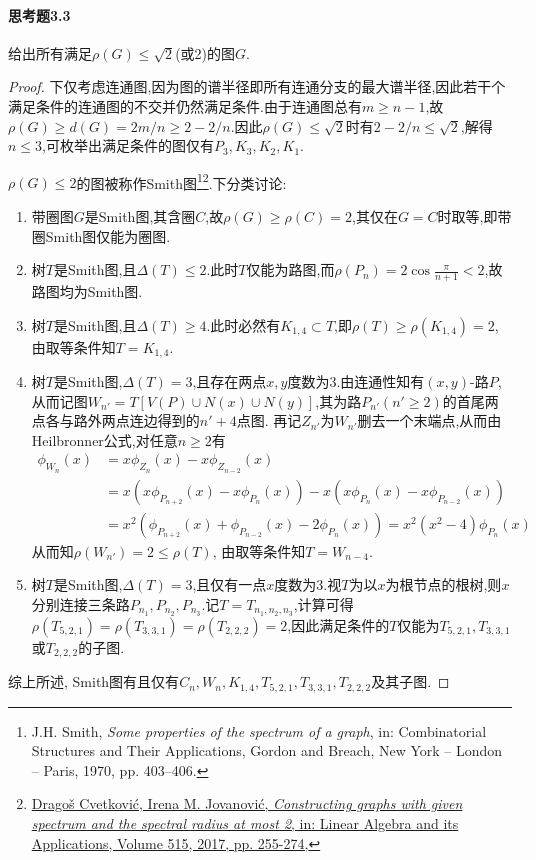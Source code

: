 \documentclass[11pt]{article}
\begin{document}
\paragraph{思考题3.3}给出所有满足$\rho(G)\leq \sqrt{2}$(或2)的图$G$.
\begin{proof}
    下仅考虑连通图,因为图的谱半径即所有连通分支的最大谱半径,因此若干个满足条件的连通图的不交并仍然满足条件.由于连通图总有$m\geq n-1$,故$\rho(G)\geq d(G)=2m/n\geq 2-2/n$.因此$\rho(G)\leq \sqrt{2}$时有$2-2/n\leq \sqrt{2}$,解得$n\leq 3$,可枚举出满足条件的图仅有$P_3,K_3,K_2,K_1$.

    $\rho(G)\leq 2$的图被称作Smith图\footnote{J.H. Smith, \textit{Some properties of the spectrum of a graph}, in: Combinatorial Structures and Their Applications, Gordon and Breach, New York -- London -- Paris, 1970, pp. 403--406.}\footnote{\href{https://doi.org/10.1016/j.laa.2016.11.020}{Dragoš Cvetković, Irena M. Jovanović, \textit{Constructing graphs with given spectrum and the spectral radius at most 2}, in: Linear Algebra and its Applications, Volume 515, 2017, pp. 255-274,}}.下分类讨论:
    \begin{enumerate}
        \item 带圈图$G$是Smith图,其含圈$C$,故$\rho(G)\geq\rho(C)=2$,其仅在$G=C$时取等,即带圈Smith图仅能为圈图.
        \item 树$T$是Smith图,且$\Delta(T)\leq 2$.此时$T$仅能为路图,而$\rho(P_n)=2\cos\frac{\pi}{n+1}<2$,故路图均为Smith图.
        \item 树$T$是Smith图,且$\Delta(T)\geq 4$.此时必然有$K_{1,4}\subset T$,即$\rho(T)\geq \rho(K_{1,4})=2$,由取等条件知$T=K_{1,4}$.
        \item 树$T$是Smith图,$\Delta(T)=3$,且存在两点$x,y$度数为3.由连通性知有$(x,y)$-路$P$, 从而记图$W_{n'}=T[V(P)\cup N(x)\cup N(y)]$,其为路$P_{n'}(n'\geq 2)$的首尾两点各与路外两点连边得到的$n'+4$点图. 再记$Z_{n'}$为$W_{n'}$删去一个末端点,从而由Heilbronner公式,对任意$n\geq 2$有
        $$\begin{aligned}
            \phi_{W_n}(x)&=x\phi_{Z_n}(x)-x\phi_{Z_{n-2}}(x)\\
            &=x(x\phi_{P_{n+2}}(x)-x\phi_{P_n}(x))-x(x\phi_{P_n}(x)-x\phi_{P_{n-2}}(x))\\
            &=x^2(\phi_{P_{n+2}}(x)+\phi_{P_{n-2}}(x)-2\phi_{P_n}(x))=x^2(x^2-4)\phi_{P_n}(x)
        \end{aligned}$$
        从而知$\rho(W_{n'})=2\leq \rho(T)$, 由取等条件知$T=W_{n-4}$.
        \item 树$T$是Smith图,$\Delta(T)=3$,且仅有一点$x$度数为3.视$T$为以$x$为根节点的根树,则$x$分别连接三条路$P_{n_1},P_{n_2},P_{n_3}$.记$T=T_{n_1,n_2,n_3}$,计算可得$\rho(T_{5,2,1})=\rho(T_{3,3,1})=\rho(T_{2,2,2})=2$,因此满足条件的$T$仅能为$T_{5,2,1},T_{3,3,1}$或$T_{2,2,2}$的子图.
    \end{enumerate}
    综上所述, Smith图有且仅有$C_n, W_n, K_{1,4}, T_{5,2,1}, T_{3,3,1}, T_{2,2,2}$及其子图.
\end{proof}
\end{document}
